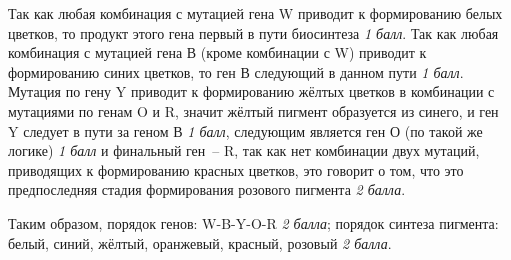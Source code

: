 \solutionSection

Так как любая комбинация с мутацией гена W приводит к формированию белых цветков, то продукт этого гена 
первый в пути биосинтеза \textit{1 балл}. Так как любая комбинация с мутацией гена В (кроме комбинации с W) приводит 
к формированию синих цветков, то ген В следующий в данном пути \textit{1 балл}. Мутация по гену Y приводит к 
формированию жёлтых цветков в комбинации с мутациями по генам O и R, значит жёлтый пигмент образуется 
из синего, и ген Y следует в пути за геном В \textit{1 балл}, следующим является ген О (по такой же логике) \textit{1 балл} и 
финальный \linebreak ген~– R, так как нет комбинации двух мутаций, приводящих к формированию красных цветков, это говорит 
о том, что это предпоследняя стадия формирования розового пигмента \textit{2 балла}. 

Таким образом, порядок генов: W-B-Y-O-R \textit{2 балла}; порядок синтеза пигмента: белый, синий, жёлтый, оранжевый, 
красный, розовый \textit{2 балла}.
